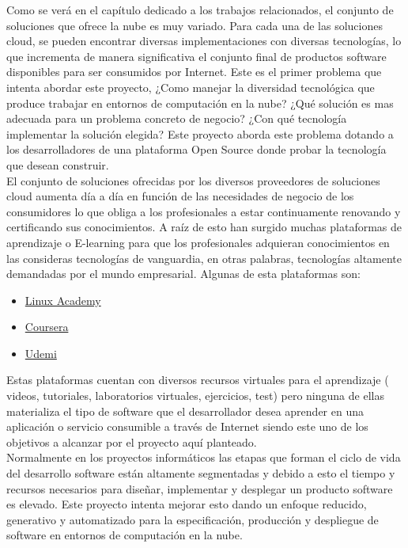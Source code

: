 \documentclass[a4paper,11pt]{book}
\begin{document}
Como se verá en el capítulo dedicado a los trabajos relacionados, el conjunto de soluciones que ofrece la nube es muy variado. Para cada una de las soluciones cloud, se pueden encontrar diversas implementaciones con diversas tecnologías, lo que incrementa
de manera significativa el conjunto final de productos software disponibles para ser consumidos por Internet. Este es el primer problema que intenta abordar este proyecto, ¿Como manejar la diversidad tecnológica que produce trabajar en entornos de computación
en la nube? ¿Qué solución es mas adecuada para un problema concreto de negocio? ¿Con qué tecnología implementar la solución elegida? Este proyecto aborda este problema dotando a los desarrolladores de una plataforma Open Source donde probar la tecnología que desean construir.\\

El conjunto de soluciones ofrecidas por los diversos proveedores de soluciones cloud aumenta día a día en función de las necesidades de negocio de los consumidores lo que obliga a los profesionales a estar continuamente renovando y certificando sus conocimientos. A raíz de esto han surgido muchas plataformas de aprendizaje o E-learning para que los profesionales adquieran conocimientos en las consideras tecnologías de vanguardia,  en otras palabras, tecnologías altamente demandadas por el mundo empresarial. Algunas de esta plataformas son:

\begin{itemize}
\item \href{https://linuxacademy.com/}{Linux Academy}
\item \href{https://es.coursera.org/}{Coursera}
\item \href{https://www.udemy.com}{Udemi}
\end{itemize}

Estas plataformas cuentan con diversos recursos virtuales para el aprendizaje ( videos, tutoriales, laboratorios virtuales, ejercicios, test) pero ninguna de ellas materializa el tipo de software que el desarrollador desea aprender en una aplicación o servicio consumible a través de Internet siendo este uno de los objetivos a alcanzar por el proyecto aquí planteado. \\


Normalmente en los proyectos informáticos las etapas que forman el ciclo de vida del desarrollo software están altamente segmentadas y debido a esto el tiempo y recursos necesarios para diseñar, implementar y desplegar un producto software es elevado.  Este proyecto intenta mejorar esto dando un enfoque reducido, generativo y automatizado para la especificación, producción y despliegue de software en entornos de computación en la nube.  
\end{document}
